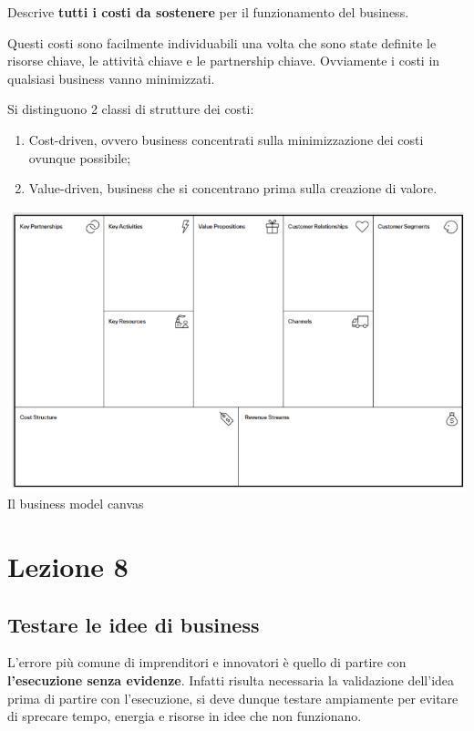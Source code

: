 \documentclass[14pt]{extarticle}
\begin{document}
Descrive \textbf{tutti i costi da sostenere} per il funzionamento del business.

Questi costi sono facilmente individuabili una volta che sono state definite le
risorse chiave, le attività chiave e le partnership chiave. Ovviamente i costi
in qualsiasi business vanno minimizzati.

Si distinguono 2 classi di strutture dei costi:

\begin{enumerate}
    \item Cost-driven, ovvero business concentrati sulla minimizzazione dei
    costi ovunque possibile;
    \item Value-driven, business che si concentrano prima sulla creazione di
    valore. 
\end{enumerate}

\begin{center}
    \includegraphics[scale=0.77]{images/businessmodelcanvas.png}
    Il business model canvas
\end{center}

\section{Lezione 8}

\subsection{Testare le idee di business}

L'errore più comune di imprenditori e innovatori è quello di partire con
\textbf{l'esecuzione senza evidenze}. Infatti risulta necessaria la validazione
dell'idea prima di partire con l'esecuzione, si deve dunque testare ampiamente
per evitare di sprecare tempo, energia e risorse in idee che non funzionano.
\end{document}
